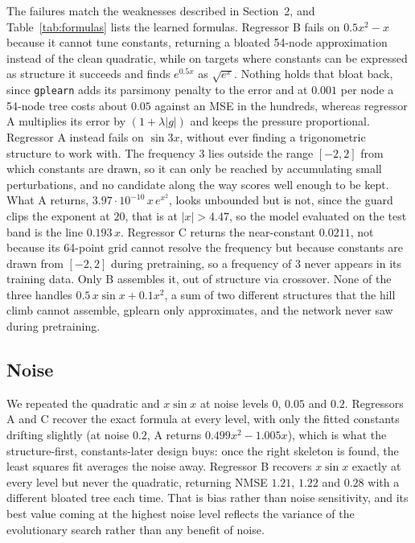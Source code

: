 \documentclass{article}
\begin{document}
The failures match the weaknesses described in Section~2, and
Table~\ref{tab:formulas} lists the learned formulas. Regressor B fails
on $0.5x^2 - x$ because it cannot tune constants, returning a bloated
54-node approximation instead of the clean quadratic, while on targets
where constants can be expressed as structure it succeeds and finds
$e^{0.5x}$ as $\sqrt{e^x}$. Nothing holds that bloat back, since
\texttt{gplearn} adds its parsimony penalty to the error and at $0.001$
per node a 54-node tree costs about $0.05$ against an MSE in the
hundreds, whereas regressor A multiplies its error by $(1+\lambda|g|)$
and keeps the pressure proportional. Regressor A instead fails on
$\sin 3x$, without ever finding a trigonometric structure to work with.
The frequency $3$ lies outside the range $[-2,2]$ from which constants
are drawn, so it can only be reached by accumulating small
perturbations, and no candidate along the way scores well enough to be
kept. What A returns, $3.97 \cdot 10^{-10}\, x\, e^{x^2}$, looks
unbounded but is not, since the guard clips the exponent at $20$, that
is at $|x| > 4.47$, so the model evaluated on the test band is the line
$0.193\,x$. Regressor C returns the near-constant $0.0211$, not because
its 64-point grid cannot resolve the frequency but because constants are
drawn from $[-2,2]$ during pretraining, so a frequency of $3$ never
appears in its training data. Only B assembles it, out of structure via
crossover. None of the three handles $0.5\,x\sin x + 0.1x^2$, a sum of
two different structures that the hill climb cannot assemble, gplearn
only approximates, and the network never saw during pretraining.



\subsection{Noise}

We repeated the quadratic and $x\sin x$ at noise levels $0$, $0.05$ and
$0.2$. Regressors A and C recover the exact formula at every level, with
only the fitted constants drifting slightly (at noise $0.2$, A returns
$0.499x^2 - 1.005x$), which is what the structure-first, constants-later
design buys: once the right skeleton is found, the least squares fit
averages the noise away. Regressor B recovers $x \sin x$ exactly at
every level but never the quadratic, returning NMSE $1.21$, $1.22$ and
$0.28$ with a different bloated tree each time. That is bias rather than
noise sensitivity, and its best value coming at the highest noise level
reflects the variance of the evolutionary search rather than any benefit
of noise.
\end{document}
